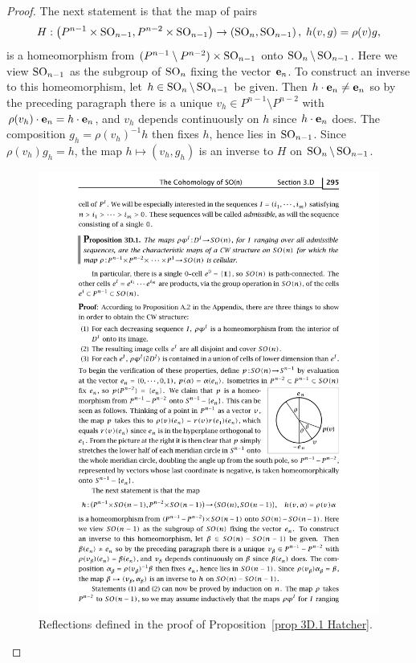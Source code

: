 \begin{proof}
    The next statement is that the map of pairs
    \[H:\left(P^{n-1}\times\SO_{n-1},P^{n-2}\times\SO_{n-1}\right)\to \left(\SO_n,\SO_{n-1}\right),\;h(v,g)=\rho(v)g,\]
    is a homeomorphism from $(P^{n-1}\setminus P^{n-2})\times\SO_{n-1}$ onto $\SO_n\setminus\SO_{n-1}$. Here we view $\SO_{n-1}$ as the subgroup of $\SO_n$ fixing the vector $\bf{e}_n$. To construct an inverse to this homeomorphism, let $h\in\SO_n\setminus \SO_{n-1}$ be given. Then $h\cdot \bf{e}_n\neq \bf{e}_n$ so by the preceding paragraph there is a unique $v_h\in P^{n-1}\setminus P^{n-2}$ with $\rho(v_h)\cdot \bf{e}_n=h\cdot \bf{e}_n$, and $v_h$ depends continuously on $h$ since $h\cdot \bf{e}_n$ does. The composition $g_h=\rho(v_h)^{-1}h$ then fixes $h$, hence lies in $\SO_{n-1}$. Since $\rho(v_h)g_h=h$, the map $h\mapsto (v_h,g_h)$ is an inverse to $H$ on $\SO_n\setminus\SO_{n-1}$.
    \begin{figure}
        \centering
        \includegraphics[scale=0.7]{figures/CW_SOn.pdf}
        \caption{Reflections defined in the proof of Proposition~\ref{prop 3D.1 Hatcher}.}
        \label{fig:CW_SOn}
    \end{figure}
    

\end{proof}
